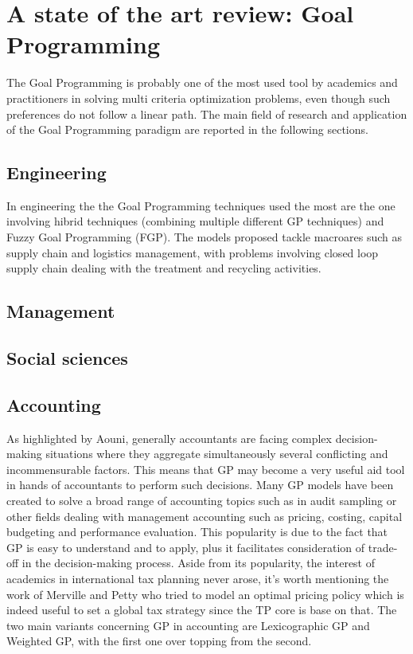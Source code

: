 \documentclass{article}
\begin{document}
\section{A state of the art review: Goal Programming}
The Goal Programming is probably one of the most used tool by academics and practitioners in solving multi criteria optimization problems, even though such preferences do not follow a linear path\cite{Romero2014}\cite{Schniederjans1995}. The main field of research and application of the Goal Programming paradigm are reported in the following sections.
\subsection{Engineering}
In engineering the the Goal Programming techniques used the most are the one involving hibrid techniques (combining multiple different GP techniques) and Fuzzy Goal Programming (FGP)\cite{colapinto_multi-criteria_2017}. The models proposed tackle macroares such as supply chain and logistics management, with problems involving closed loop supply chain dealing with the treatment and recycling activities\cite{Inserirezarandi}. 
\subsection{Management}

\subsection{Social sciences}

\subsection{Accounting}
As highlighted by Aouni\cite{aouni_goal_2017}, generally accountants are facing complex decision-making situations where they aggregate simultaneously several conflicting and incommensurable factors. This means that GP may become a very useful aid tool in hands of accountants to perform such decisions. Many GP models have been created to solve a broad range of accounting topics such as in audit sampling\cite{tayi_integration_1985} or other fields dealing with management accounting such as pricing\cite{tan_multipleobjective_2008}, costing\cite{dowlatshahi_product_2001}, capital budgeting and performance evaluation\cite{hung_integrated_2011}.
This popularity is due to the fact that GP is easy to understand and to apply, plus it facilitates consideration of trade-off in the decision-making process.
Aside from its popularity, the interest of academics in international tax planning never arose,
it’s worth mentioning the work of Merville and Petty\cite{merville_transfer_1978} who tried to model an optimal pricing policy which is indeed useful to set a global tax
strategy since the TP core is base on that.
The two main variants concerning GP in accounting are Lexicographic GP and Weighted GP, with the first one over topping from the second.
\end{document}
